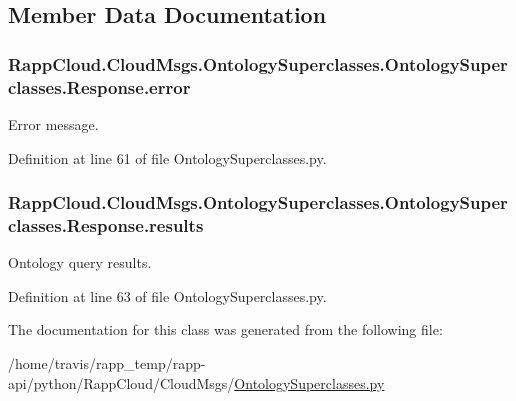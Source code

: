 \subsection{Member Data Documentation}
\hypertarget{classRappCloud_1_1CloudMsgs_1_1OntologySuperclasses_1_1OntologySuperclasses_1_1Response_a3b5c3f56b6c85763be8abcd232010f02}{
\subsubsection[{error}]{\setlength{\rightskip}{0pt plus 5cm}Rapp\-Cloud.\-Cloud\-Msgs.\-Ontology\-Superclasses.\-Ontology\-Superclasses.\-Response.\-error}}\label{classRappCloud_1_1CloudMsgs_1_1OntologySuperclasses_1_1OntologySuperclasses_1_1Response_a3b5c3f56b6c85763be8abcd232010f02}


Error message. 



Definition at line 61 of file Ontology\-Superclasses.\-py.

\hypertarget{classRappCloud_1_1CloudMsgs_1_1OntologySuperclasses_1_1OntologySuperclasses_1_1Response_abb166b09e6fbaa45b0c49b6a763ce9cd}{
\subsubsection[{results}]{\setlength{\rightskip}{0pt plus 5cm}Rapp\-Cloud.\-Cloud\-Msgs.\-Ontology\-Superclasses.\-Ontology\-Superclasses.\-Response.\-results}}\label{classRappCloud_1_1CloudMsgs_1_1OntologySuperclasses_1_1OntologySuperclasses_1_1Response_abb166b09e6fbaa45b0c49b6a763ce9cd}


Ontology query results. 



Definition at line 63 of file Ontology\-Superclasses.\-py.



The documentation for this class was generated from the following file\-:\begin{DoxyCompactItemize}
\item 
/home/travis/rapp\-\_\-temp/rapp-\/api/python/\-Rapp\-Cloud/\-Cloud\-Msgs/\hyperlink{OntologySuperclasses_8py}{Ontology\-Superclasses.\-py}\end{DoxyCompactItemize}
